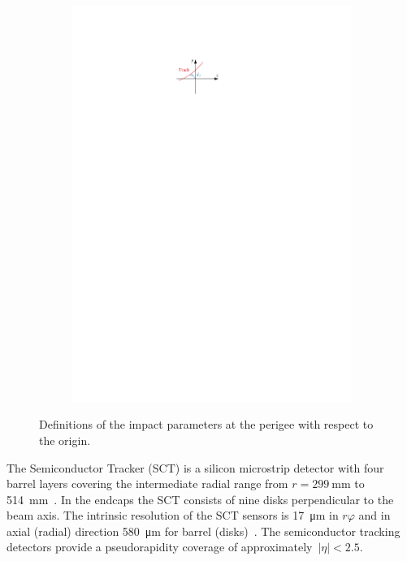 \begin{figure}[htb]
\begin{subfigure}[t]{0.48\textwidth}
    \includegraphics{./figures/atlas/impact_params_d0.pdf}
    \label{fig:transverse_impact_param}
  \end{subfigure}
  \caption{Definitions of the impact parameters at the perigee with respect to
    the origin.}
  \label{fig:impact_params}
\end{figure}

The Semiconductor Tracker (SCT) is a silicon microstrip detector with four
barrel layers covering the intermediate radial range from
$r = \SI{299}{\milli\metre}$ to \SI{514}{mm}~\cite{atlas_detector}. In the
endcaps the SCT consists of nine disks perpendicular to the beam axis. The
intrinsic resolution of the SCT sensors is \SI{17}{\micro\metre} in $r\varphi$
and in axial (radial) direction \SI{580}{\micro\metre} for barrel
(disks)~\cite{atlas_detector}. The semiconductor tracking detectors provide a
pseudorapidity coverage of approximately~$|\eta| < 2.5$.

